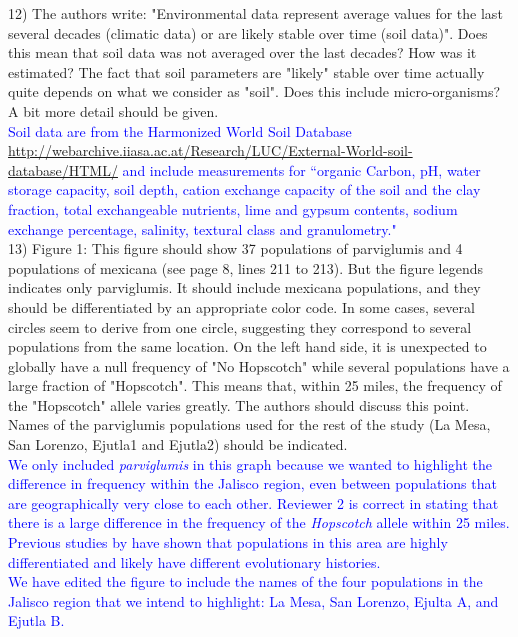 \documentclass[11pt]{article}
\newcommand{\res}[1]{\noindent \textcolor{blue}{{#1}} \\}
\begin{document}
12) The authors write: "Environmental data represent average values for the last several decades (climatic data) or are likely stable over time (soil data)". Does this mean that soil data was not averaged over the last decades? How was it estimated? The fact that soil parameters are "likely" stable over time actually quite depends on what we consider as "soil". Does this include micro-organisms? A bit more detail should be given.\\

\res{Soil data are from the Harmonized World Soil Database \url{http://webarchive.iiasa.ac.at/Research/LUC/External-World-soil-database/HTML/} and include measurements for ``organic Carbon, pH, water storage capacity, soil depth, cation exchange capacity of the soil and the clay fraction, total exchangeable nutrients, lime and gypsum contents, sodium exchange percentage, salinity, textural class and granulometry."}

13) Figure 1: This figure should show 37 populations of parviglumis and 4 populations of mexicana (see page 8, lines 211 to 213). But the figure legends indicates only parviglumis. It should include mexicana populations, and they should be differentiated by an appropriate color code. In some cases, several circles seem to derive from one circle, suggesting they correspond to several populations from the same location. On the left hand side, it is unexpected to globally have a null frequency of "No Hopscotch" while several populations have a large fraction of "Hopscotch". This means that, within 25 miles, the frequency of the "Hopscotch" allele varies greatly. The authors should discuss this point. Names of the parviglumis populations used for the rest of the study (La Mesa, San Lorenzo, Ejutla1 and Ejutla2) should be indicated.\\

\res{We only included \emph{parviglumis} in this graph because we wanted to highlight the difference in frequency within the Jalisco region, even between populations that are geographically very close to each other. Reviewer 2 is correct in stating that there is a large difference in the frequency of the \emph{Hopscotch} allele within 25 miles. Previous studies by \citet{Hufford2010, Moeller01072007} have shown that populations in this area are highly differentiated and likely have different evolutionary histories.}

\res{We have edited the figure to include the names of the four populations in the Jalisco region that we intend to highlight: La Mesa, San Lorenzo, Ejulta A, and Ejutla B.}
\end{document}

